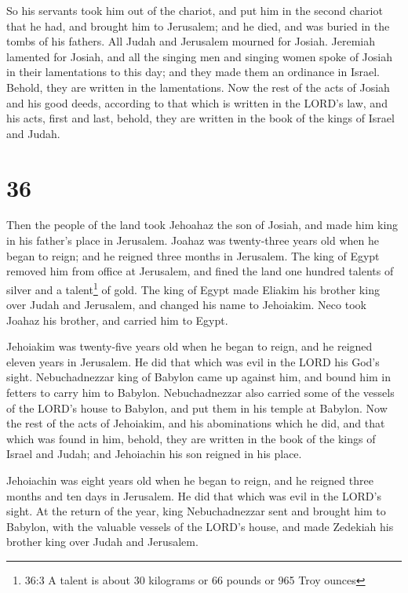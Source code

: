  So his servants took him out of the chariot, and put him
in the second chariot that he had, and brought him to Jerusalem; and he
died, and was buried in the tombs of his fathers. All Judah and
Jerusalem mourned for Josiah.  Jeremiah lamented for
Josiah, and all the singing men and singing women spoke of Josiah in
their lamentations to this day; and they made them an ordinance in
Israel. Behold, they are written in the lamentations.  Now
the rest of the acts of Josiah and his good deeds, according to that
which is written in the LORD's law,  and his acts, first
and last, behold, they are written in the book of the kings of Israel
and Judah.

\hypertarget{section-35}{%
\section{36}\label{section-35}}

 Then the people of the land took Jehoahaz the son of
Josiah, and made him king in his father's place in Jerusalem.
 Joahaz was twenty-three years old when he began to reign;
and he reigned three months in Jerusalem.  The king of Egypt
removed him from office at Jerusalem, and fined the land one hundred
talents of silver and a talent\footnote{36:3 A talent is about 30
  kilograms or 66 pounds or 965 Troy ounces} of gold.  The
king of Egypt made Eliakim his brother king over Judah and Jerusalem,
and changed his name to Jehoiakim. Neco took Joahaz his brother, and
carried him to Egypt.

 Jehoiakim was twenty-five years old when he began to reign,
and he reigned eleven years in Jerusalem. He did that which was evil in
the LORD his God's sight.  Nebuchadnezzar king of Babylon
came up against him, and bound him in fetters to carry him to Babylon.
 Nebuchadnezzar also carried some of the vessels of the
LORD's house to Babylon, and put them in his temple at Babylon.
 Now the rest of the acts of Jehoiakim, and his abominations
which he did, and that which was found in him, behold, they are written
in the book of the kings of Israel and Judah; and Jehoiachin his son
reigned in his place.

 Jehoiachin was eight years old when he began to reign, and
he reigned three months and ten days in Jerusalem. He did that which was
evil in the LORD's sight.  At the return of the year, king
Nebuchadnezzar sent and brought him to Babylon, with the valuable
vessels of the LORD's house, and made Zedekiah his brother king over
Judah and Jerusalem.

